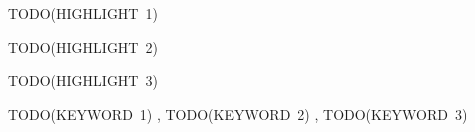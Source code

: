 \documentclass[a4paper,fleqn]{cas-sc}
\begin{document}
\let\WriteBookmarks\relax
\def\floatpagepagefraction{1}
\def\textpagefraction{.001}

\shortauthors{}

\title [mode = title]{}


\author[1]{}%
\cormark[1]
\ead{}
\credit{}


\author[2]{}%
\ead{}
\credit{}



\begin{abstract}
TODO(ABSTRACT)
\end{abstract}

\begin{highlights}
\item TODO(HIGHLIGHT~1)
\item TODO(HIGHLIGHT~2)
\item TODO(HIGHLIGHT~3)
\end{highlights}

\begin{keywords}
TODO(KEYWORD~1) \sep
TODO(KEYWORD~2) \sep
TODO(KEYWORD~3)
\end{keywords}
\end{document}
